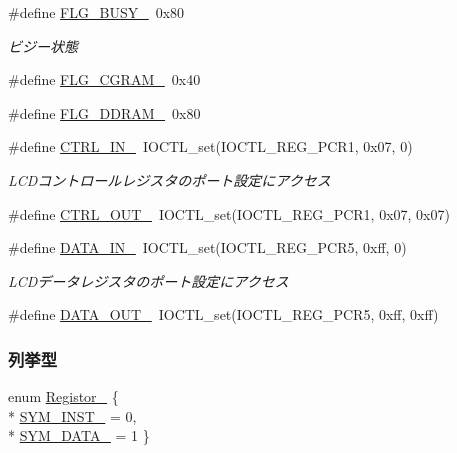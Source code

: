 \begin{DoxyCompactItemize}
\#define \hyperlink{lcd__def_8h_a9100335c5d732aad2e1b5182b6c7faf3_a9100335c5d732aad2e1b5182b6c7faf3}{F\+L\+G\+\_\+\+B\+U\+S\+Y\+\_\+}~0x80
\begin{DoxyCompactList}\small\item\em ビジー状態 \end{DoxyCompactList}\item 
\#define \hyperlink{lcd__def_8h_af4591d8d08f59c8a79670f263ad94797_af4591d8d08f59c8a79670f263ad94797}{F\+L\+G\+\_\+\+C\+G\+R\+A\+M\+\_\+}~0x40
\item 
\#define \hyperlink{lcd__def_8h_af6f68567aec0375dc1de52a4a63723b5_af6f68567aec0375dc1de52a4a63723b5}{F\+L\+G\+\_\+\+D\+D\+R\+A\+M\+\_\+}~0x80
\item 
\#define \hyperlink{lcd__def_8h_a5acf862063659f53ff393baf0a3c084c_a5acf862063659f53ff393baf0a3c084c}{C\+T\+R\+L\+\_\+\+I\+N\+\_\+}~I\+O\+C\+T\+L\+\_\+set(I\+O\+C\+T\+L\+\_\+\+R\+E\+G\+\_\+\+P\+C\+R1, 0x07, 0)
\begin{DoxyCompactList}\small\item\em L\+C\+Dコントロールレジスタのポート設定にアクセス \end{DoxyCompactList}\item 
\#define \hyperlink{lcd__def_8h_a700244d375fe1b64b6403beed6f3d07e_a700244d375fe1b64b6403beed6f3d07e}{C\+T\+R\+L\+\_\+\+O\+U\+T\+\_\+}~I\+O\+C\+T\+L\+\_\+set(I\+O\+C\+T\+L\+\_\+\+R\+E\+G\+\_\+\+P\+C\+R1, 0x07, 0x07)
\item 
\#define \hyperlink{lcd__def_8h_a93040b09391e6633c7229744479c0648_a93040b09391e6633c7229744479c0648}{D\+A\+T\+A\+\_\+\+I\+N\+\_\+}~I\+O\+C\+T\+L\+\_\+set(I\+O\+C\+T\+L\+\_\+\+R\+E\+G\+\_\+\+P\+C\+R5, 0xff, 0)
\begin{DoxyCompactList}\small\item\em L\+C\+Dデータレジスタのポート設定にアクセス \end{DoxyCompactList}\item 
\#define \hyperlink{lcd__def_8h_a7fae5e07acd0bb4bfa6786ccbc5d964b_a7fae5e07acd0bb4bfa6786ccbc5d964b}{D\+A\+T\+A\+\_\+\+O\+U\+T\+\_\+}~I\+O\+C\+T\+L\+\_\+set(I\+O\+C\+T\+L\+\_\+\+R\+E\+G\+\_\+\+P\+C\+R5, 0xff, 0xff)
\end{DoxyCompactItemize}
\subsubsection*{列挙型}
\begin{DoxyCompactItemize}
\item 
enum \hyperlink{lcd__def_8h_a409a9c208df333e5f6cf67c0866df0df_a409a9c208df333e5f6cf67c0866df0df}{Registor\+\_\+} \{ \\*
\hyperlink{lcd__def_8h_a409a9c208df333e5f6cf67c0866df0df_a409a9c208df333e5f6cf67c0866df0dfac4d4880849422ed699296cb735855884}{S\+Y\+M\+\_\+\+I\+N\+S\+T\+\_\+} = 0, 
\\*
\hyperlink{lcd__def_8h_a409a9c208df333e5f6cf67c0866df0df_a409a9c208df333e5f6cf67c0866df0dfaef83c96025f52216a682cc3d05b255cf}{S\+Y\+M\+\_\+\+D\+A\+T\+A\+\_\+} = 1
 \}
\end{DoxyCompactItemize}


